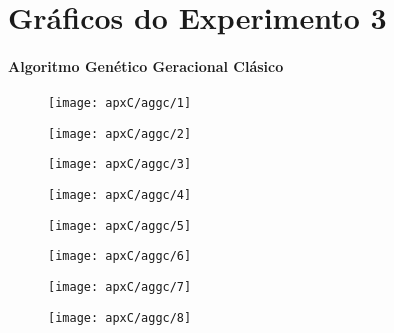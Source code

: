 \chapter{Gráficos do Experimento 3}
\subsubsection{Algoritmo Genético Geracional Clásico}

\begin{figure}[H]
\centering

\texttt{[image: apxC/aggc/1]}

\end{figure}

\begin{figure}[H]
\centering

\texttt{[image: apxC/aggc/2]}

\end{figure}

\begin{figure}[H]
\centering

\texttt{[image: apxC/aggc/3]}

\end{figure}

\begin{figure}[H]
\centering

\texttt{[image: apxC/aggc/4]}

\end{figure}

\begin{figure}[H]
\centering

\texttt{[image: apxC/aggc/5]}

\end{figure}

\begin{figure}[H]
\centering

\texttt{[image: apxC/aggc/6]}

\end{figure}

\begin{figure}[H]
\centering

\texttt{[image: apxC/aggc/7]}

\end{figure}

\begin{figure}[H]
\centering

\texttt{[image: apxC/aggc/8]}

\end{figure}

